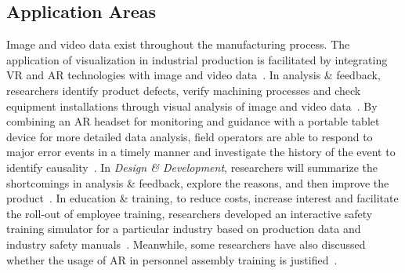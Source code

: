 \documentclass[a4paper,fleqn]{cas-dc}
\begin{document}
\subsection{Application Areas}
Image and video data exist throughout the manufacturing process. The application of visualization in industrial production is facilitated by integrating VR and AR technologies with image and video data~\cite{hamid2014virtual,Satkowski2021}. 
In analysis \& feedback, researchers identify product defects, verify machining processes and check equipment installations through visual analysis of image and video data~\cite{Cirp2019,Murithi2020,tao2020machining}. 
By combining an AR headset for monitoring and guidance with a portable tablet device for more detailed data analysis, field operators are able to respond to major error events in a timely manner and investigate the history of the event to identify causality~\cite{Becher2022,Murithi2020,North2021,Satkowski2021}.
In \textit{Design \& Development}, researchers will summarize the shortcomings in analysis \& feedback, explore the reasons, and then improve the product~\cite{Townsend2022}.
In education \& training, to reduce costs, increase interest and facilitate the roll-out of employee training, researchers developed an interactive safety training simulator for a particular industry based on production data and industry safety manuals~\cite{Moreland2019,Pantforder2009}. Meanwhile, some researchers have also discussed whether the usage of AR in personnel assembly training is justified~\cite{buttner2020augmented}.


\end{document}
